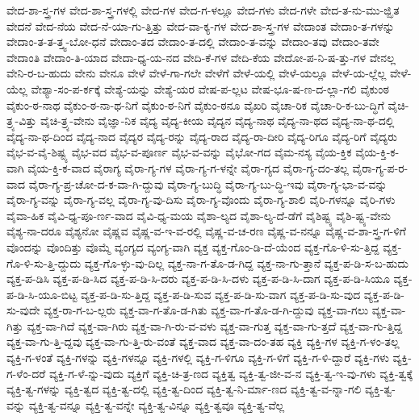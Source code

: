 {ವೇದ-ಶಾ-ಸ್ತ್ರ-ಗಳ
ವೇದ-ಶಾ-ಸ್ತ್ರ-ಗಳಲ್ಲಿ
ವೇದ-ಗಳ
ವೇದ-ಗ-ಳಲ್ಲೂ
ವೇದ-ಗಳು
ವೇದ-ಗಳೇ
ವೇದ-ತ-ನು-ಮು-ಜ್ಝಿತ
ವೇದನೆ
ವೇದ-ನೆಯ
ವೇದ-ನೆ-ಯಾ-ಗು-ತ್ತಿತ್ತು
ವೇದ-ವಾ-ಕ್ಯ-ಗಳ
ವೇದ-ಶಾ-ಸ್ತ್ರ-ಗಳ
ವೇದಾಂತ
ವೇದಾಂ-ತ-ಗಳನ್ನು
ವೇದಾಂ-ತ-ತ-ತ್ತ್ವ-ಬೋ-ಧನೆ
ವೇದಾಂ-ತದ
ವೇದಾಂ-ತ-ದಲ್ಲಿ
ವೇದಾಂ-ತ-ವನ್ನು
ವೇದಾಂ-ತವು
ವೇದಾಂ-ತವೇ
ವೇದಾಂತಿ
ವೇದಾಂ-ತಿ-ಯಾದ
ವೇದಾ-ಧ್ಯ-ಯ-ನದ
ವೇದಿ-ಕೆ-ಗಳ
ವೇದಿ-ಕೆಯ
ವೇದೋ-ಪ-ನಿ-ಷ-ತ್ತು-ಗಳ
ವೇನಲ್ಲ
ವೇನಿ-ರ-ಬ-ಹುದು
ವೇನು
ವೇನೂ
ವೇಳೆ
ವೇಳೆ-ಗಾ-ಗಲೇ
ವೇಳೆಗೆ
ವೇಳೆ-ಯಲ್ಲಿ
ವೇಳೆ-ಯಲ್ಲೂ
ವೇಳೆ-ಯ-ಲ್ಲೆಲ್ಲ
ವೇಳೆ-ಯೆಲ್ಲ
ವೇಶ್ಯಾ-ಸಂ-ಪ-ರ್ಕಕ್ಕೆ
ವೇಶ್ಯೆ-ಯನ್ನು
ವೇಶ್ಯೆ-ಯರ
ವೇಷ-ಪ-ಲ್ಲಟ
ವೇಷ-ಭೂ-ಷ-ಣ-ದ-ಲ್ಲಾ-ಗಲಿ
ವೈಕುಂಠ
ವೈಕುಂ-ಠ-ನಾಥ
ವೈಕುಂ-ಠ-ನಾ-ಥ-ನಿಗೆ
ವೈಕುಂ-ಠ-ನಿಗೆ
ವೈಕುಂ-ಠನೂ
ವೈಖರಿ
ವೈಚಾ-ರಿಕ
ವೈಚಾ-ರಿ-ಕ-ಬು-ದ್ಧಿಗೆ
ವೈಚಿ-ತ್ರ್ಯ-ವಿತ್ತು
ವೈಚಿ-ತ್ರ್ಯ-ವೇನು
ವೈಜ್ಞಾ-ನಿಕ
ವೈದ್ಯ
ವೈದ್ಯ-ಕೀಯ
ವೈದ್ಯನ
ವೈದ್ಯ-ನಾಥ
ವೈದ್ಯ-ನಾ-ಥದ
ವೈದ್ಯ-ನಾ-ಥ-ದಲ್ಲಿ
ವೈದ್ಯ-ನಾ-ಥ-ದಿಂದ
ವೈದ್ಯ-ನಾದ
ವೈದ್ಯರ
ವೈದ್ಯ-ರನ್ನು
ವೈದ್ಯ-ರಾದ
ವೈದ್ಯ-ರಾ-ದೀರಿ
ವೈದ್ಯ-ರಿಗೂ
ವೈದ್ಯ-ರಿಗೆ
ವೈದ್ಯರು
ವೈಭ-ವ-ವೈ-ಶಿಷ್ಟ್ಯ
ವೈಭ-ವದ
ವೈಭ-ವ-ಪೂರ್ಣ
ವೈಭ-ವ-ವನ್ನು
ವೈಭೋ-ಗದ
ವೈಮ-ನಸ್ಯ
ವೈಯ-ಕ್ತಿಕ
ವೈಯ-ಕ್ತಿ-ಕ-ವಾಗಿ
ವೈಯ-ಕ್ತಿ-ಕ-ವಾದ
ವೈರಾಗ್ಯ
ವೈರಾ-ಗ್ಯ-ಗಳ
ವೈರಾ-ಗ್ಯ-ಗ-ಳನ್ನೇ
ವೈರಾ-ಗ್ಯದ
ವೈರಾ-ಗ್ಯ-ದಂ-ತಲ್ಲ
ವೈರಾ-ಗ್ಯ-ಪ-ರ-ವಾದ
ವೈರಾ-ಗ್ಯ-ಪ್ರ-ಚೋ-ದ-ಕ-ವಾ-ಗಿ-ದ್ದುವು
ವೈರಾ-ಗ್ಯ-ಬುದ್ಧಿ
ವೈರಾ-ಗ್ಯ-ಬು-ದ್ಧಿ-ಇವು
ವೈರಾ-ಗ್ಯ-ಭಾ-ವ-ವನ್ನು
ವೈರಾ-ಗ್ಯ-ವನ್ನು
ವೈರಾ-ಗ್ಯ-ವಲ್ಲ
ವೈರಾ-ಗ್ಯ-ವು-ದಿಸು
ವೈರಾ-ಗ್ಯ-ವೊಂದು
ವೈರಾ-ಗ್ಯ-ಶಾಲಿ
ವೈರಿ-ಗಳನ್ನೂ
ವೈರಿ-ಗಳು
ವೈವಾ-ಹಿಕ
ವೈವಿ-ಧ್ಯ-ಪೂ-ರ್ಣ-ವಾದ
ವೈವಿ-ಧ್ಯ-ಮಯ
ವೈಶಾ-ಲ್ಯದ
ವೈಶಾ-ಲ್ಯ-ದೆ-ಡೆಗೆ
ವೈಶಿಷ್ಟ್ಯ
ವೈಶಿ-ಷ್ಟ್ಯ-ವೇನು
ವೈಶ್ಯ-ನಾ-ದರೂ
ವೈಶ್ಯನೋ
ವೈಷ್ಣವ
ವೈಷ್ಣ-ವ-ಇ-ವ-ರಲ್ಲಿ
ವೈಷ್ಣ-ವ-ಚ-ರಣ
ವೈಷ್ಣ-ವ-ನನ್ನೂ
ವೈಷ್ಣ-ವ-ಶಾ-ಸ್ತ್ರ-ಗ-ಳಿಗೆ
ವೊಂದನ್ನು
ವೊಂದಿತ್ತು
ವೊಮ್ಮೆ
ವ್ಯಂಗ್ಯದ
ವ್ಯಂಗ್ಯ-ವಾಗಿ
ವ್ಯಕ್ತ
ವ್ಯಕ್ತ-ಗೊಂ-ಡಿ-ದೆ-ಯೆಂದ
ವ್ಯಕ್ತ-ಗೊ-ಳಿ-ಸು-ತ್ತಿದ್ದ
ವ್ಯಕ್ತ-ಗೊ-ಳಿ-ಸು-ತ್ತಿ-ದ್ದುದು
ವ್ಯಕ್ತ-ಗೊ-ಳ್ಳು-ವು-ದಿಲ್ಲ
ವ್ಯಕ್ತ-ನಾ-ಗ-ತೊ-ಡ-ಗಿದ್ದ
ವ್ಯಕ್ತ-ನಾ-ಗು-ತ್ತಾನೆ
ವ್ಯಕ್ತ-ಪ-ಡಿ-ಸ-ಬ-ಹುದು
ವ್ಯಕ್ತ-ಪ-ಡಿಸಿ
ವ್ಯಕ್ತ-ಪ-ಡಿ-ಸಿದ
ವ್ಯಕ್ತ-ಪ-ಡಿ-ಸಿ-ದರು
ವ್ಯಕ್ತ-ಪ-ಡಿ-ಸಿ-ದಳು
ವ್ಯಕ್ತ-ಪ-ಡಿ-ಸಿ-ದಾಗ
ವ್ಯಕ್ತ-ಪ-ಡಿ-ಸಿಯೂ
ವ್ಯಕ್ತ-ಪ-ಡಿ-ಸಿ-ಯೂ-ಬಿಟ್ಟ
ವ್ಯಕ್ತ-ಪ-ಡಿ-ಸು-ತ್ತಿದ್ದ
ವ್ಯಕ್ತ-ಪ-ಡಿ-ಸುವ
ವ್ಯಕ್ತ-ಪ-ಡಿ-ಸು-ವಾಗ
ವ್ಯಕ್ತ-ಪ-ಡಿ-ಸು-ವುದ
ವ್ಯಕ್ತ-ಪ-ಡಿ-ಸು-ವುದೇ
ವ್ಯಕ್ತ-ರಾ-ಗ-ಬ-ಲ್ಲರು
ವ್ಯಕ್ತ-ವಾ-ಗ-ತೊ-ಡ-ಗಿತು
ವ್ಯಕ್ತ-ವಾ-ಗ-ತೊ-ಡ-ಗಿ-ದ್ದುವು
ವ್ಯಕ್ತ-ವಾ-ಗಲು
ವ್ಯಕ್ತ-ವಾ-ಗಿತ್ತು
ವ್ಯಕ್ತ-ವಾ-ಗಿದೆ
ವ್ಯಕ್ತ-ವಾ-ಗಿರು
ವ್ಯಕ್ತ-ವಾ-ಗಿ-ರು-ವ-ವಳು
ವ್ಯಕ್ತ-ವಾ-ಗುತ್ತ
ವ್ಯಕ್ತ-ವಾ-ಗು-ತ್ತದೆ
ವ್ಯಕ್ತ-ವಾ-ಗು-ತ್ತಿದ್ದ
ವ್ಯಕ್ತ-ವಾ-ಗು-ತ್ತಿ-ದ್ದವು
ವ್ಯಕ್ತ-ವಾ-ಗು-ತ್ತಿ-ರು-ವಂತೆ
ವ್ಯಕ್ತ-ವಾದ
ವ್ಯಕ್ತ-ವಾ-ದಂ-ತಹ
ವ್ಯಕ್ತಿ
ವ್ಯಕ್ತಿ-ಗಳ
ವ್ಯಕ್ತಿ-ಗ-ಳಂ-ತಲ್ಲ
ವ್ಯಕ್ತಿ-ಗ-ಳಂತೆ
ವ್ಯಕ್ತಿ-ಗಳನ್ನು
ವ್ಯಕ್ತಿ-ಗಳನ್ನೂ
ವ್ಯಕ್ತಿ-ಗಳಲ್ಲಿ
ವ್ಯಕ್ತಿ-ಗ-ಳಿಗೂ
ವ್ಯಕ್ತಿ-ಗ-ಳಿಗೆ
ವ್ಯಕ್ತಿ-ಗ-ಳಿ-ದ್ದಾರೆ
ವ್ಯಕ್ತಿ-ಗಳು
ವ್ಯಕ್ತಿ-ಗ-ಳೆಂ-ದರೆ
ವ್ಯಕ್ತಿ-ಗ-ಳೆ-ನ್ನು-ವುದು
ವ್ಯಕ್ತಿಗೆ
ವ್ಯಕ್ತಿ-ಚಿ-ತ್ರ-ಣದ
ವ್ಯಕ್ತಿತ್ವ
ವ್ಯಕ್ತಿ-ತ್ವ-ಜೀ-ವ-ನ
ವ್ಯಕ್ತಿ-ತ್ವ-ಇ-ವು-ಗಳು
ವ್ಯಕ್ತಿ-ತ್ವಕ್ಕೆ
ವ್ಯಕ್ತಿ-ತ್ವ-ಗಳನ್ನು
ವ್ಯಕ್ತಿ-ತ್ವದ
ವ್ಯಕ್ತಿ-ತ್ವ-ದಲ್ಲಿ
ವ್ಯಕ್ತಿ-ತ್ವ-ದಿಂದ
ವ್ಯಕ್ತಿ-ತ್ವ-ನಿ-ರ್ಮಾ-ಣದ
ವ್ಯಕ್ತಿ-ತ್ವ-ವ-ನ್ನಾ-ಗಲಿ
ವ್ಯಕ್ತಿ-ತ್ವ-ವನ್ನು
ವ್ಯಕ್ತಿ-ತ್ವ-ವನ್ನೂ
ವ್ಯಕ್ತಿ-ತ್ವ-ವನ್ನೇ
ವ್ಯಕ್ತಿ-ತ್ವ-ವಿನ್ನೂ
ವ್ಯಕ್ತಿ-ತ್ವವೂ
ವ್ಯಕ್ತಿ-ತ್ವ-ವೆಲ್ಲ
}
